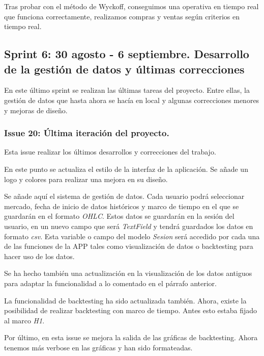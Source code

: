 Tras probar con el método de Wyckoff, conseguimos una operativa en tiempo real que funciona correctamente, realizamos compras y ventas según criterios en tiempo real.

\subsection{Sprint 6: 30 agosto - 6 septiembre. Desarrollo de la gestión de datos y últimas correcciones}

En este último sprint se realizan las últimas tareas del proyecto. Entre ellas, la gestión de datos que hasta ahora se hacía en local y algunas correcciones menores y mejoras de diseño. \newline

\subsubsection{Issue 20: Última iteración del proyecto.}

Esta issue realizar los últimos desarrollos y correcciones del trabajo.\newline

En este punto se actualiza el estilo de la interfaz de la aplicación. Se añade un logo y colores para realizar una mejora en su diseño. \newline

Se añade aquí el sistema de gestión de datos. Cada usuario podrá seleccionar mercado, fecha de inicio de datos históricos y marco de tiempo en el que se guardarán en el formato \textit{OHLC}. Estos datos se guardarán en la sesión del usuario, en un nuevo campo que será \textit{TextField} y tendrá guardados los datos en formato \textit{csv}. Esta variable o campo del modelo \textit{Sesion} será accedido por cada una de las funciones de la APP tales como visualización de datos o backtesting para hacer uso de los datos. \newline

Se ha hecho también una actualización en la visualización de los datos antiguos para adaptar la funcionalidad a lo comentado en el párrafo anterior.\newline

La funcionalidad de backtesting ha sido actualizada también. Ahora, existe la posibilidad de realizar backtesting con marco de tiempo. Antes esto estaba fijado al marco \textit{H1}.\newline

Por último, en esta issue se mejora la salida de las gráficas de backtesting. Ahora tenemos más verbose en las gráficas y han sido formateadas.\newline

